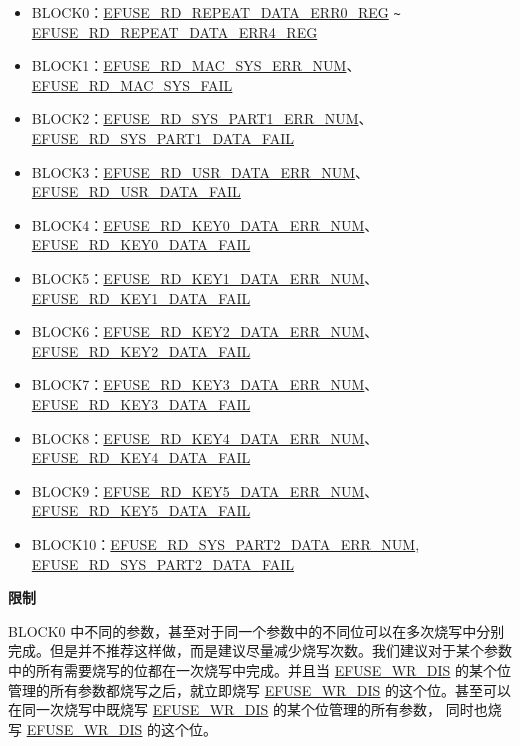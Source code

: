 \documentclass[main\_\_CN.tex]{subfiles}
\begin{document}
\begin{enumerate}
\begin{itemize}
    \item BLOCK0：\hyperref[regdesc:EFUSERDREPEATDATAERR0REG]{EFUSE\_RD\_REPEAT\_DATA\_ERR0\_REG} \verb+~+ \hyperref[regdesc:EFUSERDREPEATDATAERR4REG]{EFUSE\_RD\_REPEAT\_DATA\_ERR4\_REG}
    \item BLOCK1：\hyperref[fielddesc:EFUSERDMACSYSERRNUM] {EFUSE\_RD\_MAC\_SYS\_ERR\_NUM}、\hyperref[fielddesc:EFUSERDMACSYSFAIL] {EFUSE\_RD\_MAC\_SYS\_FAIL}
    \item BLOCK2：\hyperref[fielddesc:EFUSERDSYSPART1DATAERRNUM] {EFUSE\_RD\_SYS\_PART1\_ERR\_NUM}、\hyperref[fielddesc:EFUSERDSYSPART1DATAFAIL] {EFUSE\_RD\_SYS\_PART1\_DATA\_FAIL}
    \item BLOCK3：\hyperref[fielddesc:EFUSERDUSRDATAERRNUM] {EFUSE\_RD\_USR\_DATA\_ERR\_NUM}、\hyperref[fielddesc:EFUSERDUSRDATAFAIL] {EFUSE\_RD\_USR\_DATA\_FAIL}
    \item BLOCK4：\hyperref[fielddesc:EFUSERDKEY0DATAERRNUM] {EFUSE\_RD\_KEY0\_DATA\_ERR\_NUM}、\hyperref[fielddesc:EFUSERDKEY0DATAFAIL] {EFUSE\_RD\_KEY0\_DATA\_FAIL}
    \item BLOCK5：\hyperref[fielddesc:EFUSERDKEY1DATAERRNUM] {EFUSE\_RD\_KEY1\_DATA\_ERR\_NUM}、\hyperref[fielddesc:EFUSERDKEY1DATAFAIL] {EFUSE\_RD\_KEY1\_DATA\_FAIL}
    \item BLOCK6：\hyperref[fielddesc:EFUSERDKEY2DATAERRNUM] {EFUSE\_RD\_KEY2\_DATA\_ERR\_NUM}、\hyperref[fielddesc:EFUSERDKEY2DATAFAIL] {EFUSE\_RD\_KEY2\_DATA\_FAIL}
    \item BLOCK7：\hyperref[fielddesc:EFUSERDKEY3DATAERRNUM] {EFUSE\_RD\_KEY3\_DATA\_ERR\_NUM}、\hyperref[fielddesc:EFUSERDKEY3DATAFAIL] {EFUSE\_RD\_KEY3\_DATA\_FAIL}
    \item BLOCK8：\hyperref[fielddesc:EFUSERDKEY4DATAERRNUM] {EFUSE\_RD\_KEY4\_DATA\_ERR\_NUM}、\hyperref[fielddesc:EFUSERDKEY4DATAFAIL] {EFUSE\_RD\_KEY4\_DATA\_FAIL}
    \item BLOCK9：\hyperref[fielddesc:EFUSERDKEY5DATAERRNUM] {EFUSE\_RD\_KEY5\_DATA\_ERR\_NUM}、\hyperref[fielddesc:EFUSERDKEY5DATAFAIL] {EFUSE\_RD\_KEY5\_DATA\_FAIL}
    \item BLOCK10：\hyperref[fielddesc:EFUSERDSYSPART2DATAERRNUM] {EFUSE\_RD\_SYS\_PART2\_DATA\_ERR\_NUM}, \hyperref[fielddesc:EFUSERDSYSPART2DATAFAIL] {EFUSE\_RD\_SYS\_PART2\_DATA\_FAIL}
\end{itemize}
\end{enumerate}

{\bfseries 限制}

BLOCK0 中不同的参数，甚至对于同一个参数中的不同位可以在多次烧写中分别完成。但是并不推荐这样做，而是建议尽量减少烧写次数。我们建议对于某个参数中的所有需要烧写的位都在一次烧写中完成。并且当 \hyperref[fielddesc:EFUSEWRDIS]{EFUSE\_WR\_DIS} 的某个位管理的所有参数都烧写之后，就立即烧写 \hyperref[fielddesc:EFUSEWRDIS]{EFUSE\_WR\_DIS} 的这个位。甚至可以在同一次烧写中既烧写 \hyperref[fielddesc:EFUSEWRDIS]{EFUSE\_WR\_DIS} 的某个位管理的所有参数，
同时也烧写 \hyperref[fielddesc:EFUSEWRDIS]{EFUSE\_WR\_DIS} 的这个位。
\end{document}
